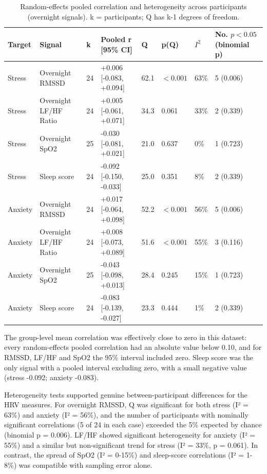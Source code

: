 \documentclass[11pt, a4paper, oneside]{article}
\begin{document}
\begin{table}[H]
    \centering
    \caption{Random-effects pooled correlation and heterogeneity across participants (overnight signals). k = participants; Q has k-1 degrees of freedom.}
    \begin{tabularx}{\textwidth}{XXXXXXXX}
        \toprule
        \textbf{Target} & \textbf{Signal} & \textbf{k} & \textbf{Pooled r [95\% CI]} & \textbf{Q} & \textbf{p(Q)} & \textbf{$I^2$} & \textbf{No. $p < 0.05$ (binomial p)}\\
        \midrule
        Stress & Overnight RMSSD & 24 & +0.006 [-0.083, +0.094] & 62.1 & $<0.001$ & 63\% & 5 (0.006)\\
        Stress & Overnight LF/HF Ratio & 24 & +0.005 [-0.061, +0.071] & 34.3 & 0.061 & 33\% & 2 (0.339)\\
        Stress & Overnight SpO2 & 25 & -0.030 [-0.081, +0.021] & 21.0 & 0.637 & 0\% & 1 (0.723)\\
        Stress & Sleep score & 24 & -0.092 [-0.150, -0.033] & 25.0 & 0.351 & 8\% & 2 (0.339)\\
        Anxiety & Overnight RMSSD & 24 & +0.017 [-0.064, +0.098] & 52.2 & $<0.001$ & 56\% & 5 (0.006)\\
        Anxiety & Overnight LF/HF Ratio & 24 & +0.008 [-0.073, +0.089] & 51.6 & $<0.001$ & 55\% & 3 (0.116)\\
        Anxiety & Overnight SpO2 & 25 & -0.043 [-0.098, +0.013] & 28.4 & 0.245 & 15\% & 1 (0.723)\\
        Anxiety & Sleep score & 24 & -0.083 [-0.139, -0.027] & 23.3 & 0.444 & 1\% & 2 (0.339)\\
        \bottomrule
    \end{tabularx}
    \label{tab:Table_4}
\end{table}

The group-level mean correlation was effectively close to zero in this dataset: every random-effects pooled correlation had an absolute value below 0.10, and for RMSSD, LF/HF and SpO2 the 95\% interval included zero. Sleep score was the only signal with a pooled interval excluding zero, with a small negative value (stress -0.092; anxiety -0.083).

Heterogeneity tests supported genuine between-participant differences for the HRV measures. For overnight RMSSD, Q was significant for both stress (I² = 63\%) and anxiety (I² = 56\%), and the number of participants with nominally significant correlations (5 of 24 in each case) exceeded the 5\% expected by chance (binomial p = 0.006). LF/HF showed significant heterogeneity for anxiety (I² = 55\%) and a similar but non-significant trend for stress (I² = 33\%, p = 0.061). In contrast, the spread of SpO2 (I² = 0-15\%) and sleep-score correlations (I² = 1-8\%) was compatible with sampling error alone.
\end{document}
